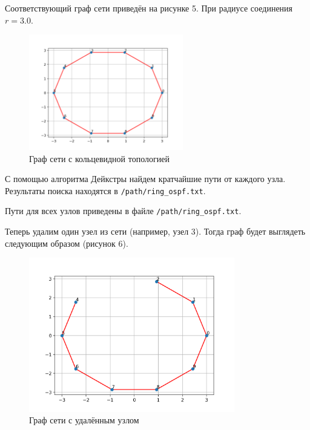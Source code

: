 \documentclass[a4paper,14pt]{extarticle}
\begin{document}
Соответствующий граф сети приведён на рисунке 5. При радиусе соединения $r=3.0$.

\begin{figure}[htbp]
    \centering
    \includegraphics[width=0.6\textwidth]{img/ring_graph.png}
    \caption{Граф сети с кольцевидной топологией}
    \label{fig:hamiltonianGraph}
\end{figure}

С помощью алгоритма Дейкстры найдем кратчайшие пути от каждого узла. Результаты поиска находятся в \texttt{/path/ring\_ospf.txt}.



Пути для всех узлов приведены в файле \texttt{/path/ring\_ospf.txt}.

Теперь удалим один узел из сети (например, узел 3). Тогда граф будет выглядеть следующим образом (рисунок 6).

\clearpage
\begin{figure}[htbp]
    \centering
    \includegraphics[width=0.8\textwidth]{img/ring_modified.png}
    \caption{Граф сети с удалённым узлом}
    \label{fig:hamiltonianGraph}
\end{figure}
\end{document}
